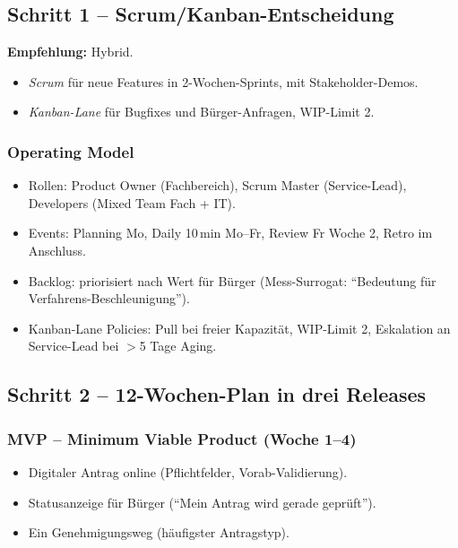 \documentclass[11pt,a4paper,oneside]{article}
\begin{document}
\subsection{Schritt 1 -- Scrum/Kanban-Entscheidung}

\textbf{Empfehlung:} Hybrid.

\begin{itemize}
  \item \emph{Scrum} für neue Features in 2-Wochen-Sprints, mit Stakeholder-Demos.
  \item \emph{Kanban-Lane} für Bugfixes und Bürger-Anfragen, WIP-Limit 2.
\end{itemize}

\subsubsection{Operating Model}

\begin{itemize}
  \item Rollen: Product Owner (Fachbereich), Scrum Master (Service-Lead), Developers (Mixed Team Fach + IT).
  \item Events: Planning Mo, Daily 10\,min Mo--Fr, Review Fr Woche 2, Retro im Anschluss.
  \item Backlog: priorisiert nach Wert für Bürger (Mess-Surrogat: ``Bedeutung für Verfahrens-Beschleunigung'').
  \item Kanban-Lane Policies: Pull bei freier Kapazität, WIP-Limit 2, Eskalation an Service-Lead bei $>$5 Tage Aging.
\end{itemize}

\subsection{Schritt 2 -- 12-Wochen-Plan in drei Releases}

\subsubsection{MVP -- Minimum Viable Product (Woche 1--4)}

\begin{itemize}
  \item Digitaler Antrag online (Pflichtfelder, Vorab-Validierung).
  \item Statusanzeige für Bürger (``Mein Antrag wird gerade geprüft'').
  \item Ein Genehmigungsweg (häufigster Antragstyp).
\end{itemize}
\end{document}
